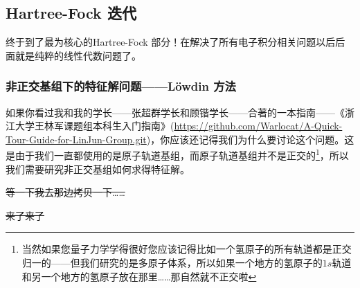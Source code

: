 \documentclass[12pt,a4paper,openany,twoside]{article}
\numberwithin{equation}{section}
\begin{document}
            \subsection{Hartree-Fock 迭代}
            终于到了最为核心的Hartree-Fock 部分！在解决了所有电子积分相关问题以后后面就是纯粹的线性代数问题了。
                \subsubsection{非正交基组下的特征解问题——L\"owdin 方法}
                如果你看过我和我的学长——张超群学长和顾锴学长——合著的一本指南——《浙江大学王林军课题组本科生入门指南》(\url{https://github.com/Warlocat/A-Quick-Tour-Guide-for-LinJun-Group.git})，你应该还记得我们为什么要讨论这个问题。这是由于我们一直都使用的是原子轨道基组，而原子轨道基组并不是正交的\footnote{当然如果您量子力学学得很好您应该记得比如一个氢原子的所有轨道都是正交归一的——但我们研究的是多原子体系，所以如果一个地方的氢原子的$1s$轨道和另一个地方的氢原子放在那里……那自然就不正交啦}，所以我们需要研究非正交基组如何求得特征解。

                \sout{等一下我去那边拷贝一下……}

                \sout{来了来了}
\end{document}
